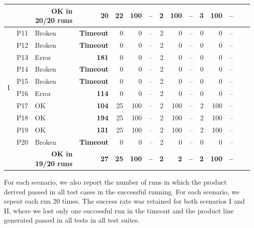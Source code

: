\begin{table}[t]
{\begin{tabular}{llrrrrrrrrrrrrr}
		 \rowcolor[gray]{.9} & \textbf{\autoscalpel} &\textbf{OK in 20/20 runs} &\textbf{20} &\textbf{22} &\textbf{100} &\textbf{--} &\textbf{2} &\textbf{100} &\textbf{--} &\textbf{3} &\textbf{100} &\textbf{--}\\
		 \hline
		\multirow{10}{*}{I} & P11 &\multicolumn{1}{l}{Broken} & \multicolumn{1}{l}{\textbf{Timeout}}  & 0 &0  &--   &2 &0 &--   &0 &0 &--   \\
		 & P12 &\multicolumn{1}{l}{Broken}  & \multicolumn{1}{l}{\textbf{Timeout}} & 0 &0  &--  &2 &0 &--   &0 &0 &--   \\
		 & P13 &\multicolumn{1}{l}{Error}    &\textbf{181} & 0 &0  &--   &2 &0 &--   &0 &0 &--   \\
		 & P14  &\multicolumn{1}{l}{Broken} &\multicolumn{1}{l}{\textbf{Timeout}}   & 0 &0  &--   &2 &0 &--   &0 &0 &--   \\
		 & P15 &\multicolumn{1}{l}{Broken}  &\multicolumn{1}{l}{\textbf{Timeout}}   & 0 &0  &--   &2 &0 &--   &0 &0 &--   \\
		 & P16 &\multicolumn{1}{l}{Error}    &\textbf{114} & 0 &0  &--   &2 &0 &--   &0 &0 &--   \\
		 & P17 &\multicolumn{1}{l}{OK}       &\cellcolor[gray]{.9}\textbf{104} &25  &100 &-- &2 &100 &-- &2 &100 &-- \\
		 & P18 &\multicolumn{1}{l}{OK}       &\textbf{194} &25  &100 &-- &2 &100 &-- &2 &100 &-- \\
		 & P19 &\multicolumn{1}{l}{OK}       &\textbf{131} &25  &100 &-- &2 &100 &-- &2 &100 &-- \\
		 & P20 &\multicolumn{1}{l}{Broken} & \multicolumn{1}{l}{\textbf{Timeout}} &0   &0  &--   &2 &0 &--   &0 &0 &--   \\
		 \hline 
		 \rowcolor[gray]{.9} &\textbf{\autoscalpel} &\textbf{OK in 19/20 runs} &\textbf{27} & \textbf{25} & \textbf{100} & \textbf{--} &\textbf{2} &\textbf{2} &\textbf{--}  &\textbf{2} &\textbf{100} &\textbf{--}\\\hline

	\end{tabular}
}
\end{table}

For each scenario, we also report the number of \autoscalpel runs in which the product derived passed in all test cases in the successful running. For each scenario, we repeat each run 20 times. The success rate was retained for both scenarios I and II, where we lost only one successful run in the timeout and the product line generated passed in all tests in all test suites.

